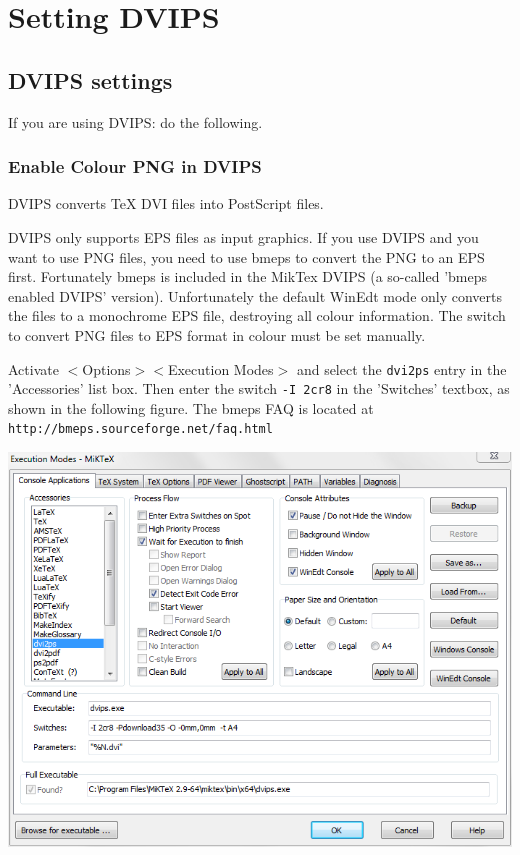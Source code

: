 
\chapter{Setting DVIPS}

\section{DVIPS settings}

If you are using DVIPS: do the following.


\subsection{Enable Colour PNG in DVIPS}

DVIPS converts \TeX{} DVI files into PostScript files.

DVIPS only supports EPS files as input graphics. If you use DVIPS and you want to use PNG files, you need to use bmeps to convert the PNG to an EPS first. Fortunately bmeps is included in the MikTex DVIPS (a so-called 'bmeps enabled DVIPS' version).  Unfortunately the default WinEdt mode only converts the files to a monochrome EPS file, destroying all colour information.  The switch to convert PNG files to EPS format in colour must be set manually.

Activate
$<$Options$>$$<$Execution Modes$>$ and select the \lstinline{dvi2ps} entry in the 'Accessories' list box. Then enter the switch \verb"-I 2cr8" in the 'Switches' textbox, as shown in the following figure.  The bmeps FAQ is located at \verb"http://bmeps.sourceforge.net/faq.html"

\centerline{\includegraphics[bb=0 0 696 546,width=\textwidth]{eps/dvipsbmeps.png}}

